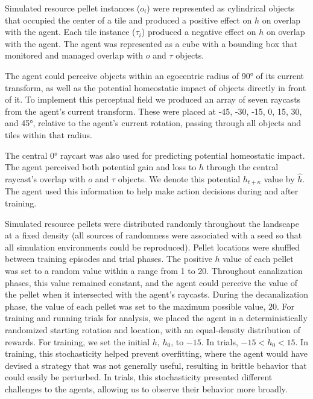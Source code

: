 Simulated resource pellet instances (\(o_i\)) were represented as cylindrical objects that occupied the center of a tile and produced a positive effect on \(h\) on overlap with the agent. Each tile instance (\(\tau_i\)) produced a negative effect on \(h\) on overlap with the agent. The agent was represented as a cube with a bounding box that monitored and managed overlap with \(o\) and \(\tau\) objects.

The agent could perceive objects within an egocentric radius of 90° of its current transform, as well as the potential homeostatic impact of objects directly in front of it. To implement this perceptual field we produced an array of seven raycasts from the agent's current transform. These were placed at -45, -30, -15, 0, 15, 30, and 45°, relative to the agent's current rotation, passing through all objects and tiles within that radius.

The central 0° raycast was also used for predicting potential homeostatic impact. The agent perceived both potential gain and loss to \(h\) through the central raycast's  overlap with \(o\) and \(\tau\) objects. We denote this potential \(h_{t+\kappa}\) value by \(\hat{h}\). The agent used this information to help make action decisions during and after training. 

Simulated resource pellets were distributed randomly throughout the landscape at a fixed density (all sources of randomness were associated with a seed so that all simulation environments could be reproduced). Pellet locations were shuffled between training episodes and trial phases. The positive \(h\) value of each pellet was set to a random value within a range from 1 to 20. Throughout canalization phases, this value remained constant, and the agent could perceive the value of the pellet when it intersected with the agent's raycasts. During the decanalization phase, the value of each pellet was set to the maximum possible value, \(20\). For training and running trials for analysis, we placed the agent in a deterministically randomized starting rotation and location, with an equal-density distribution of rewards. For training, we set the initial \(h\), \(h_0\), to \(-15\). In trials, \(-15 < h_0 < 15\). In training, this stochasticity helped prevent overfitting, where the agent would have devised a strategy that was not generally useful, resulting in brittle behavior that could easily be perturbed. In trials, this stochasticity presented different challenges to the agents, allowing us to observe their behavior more broadly.

